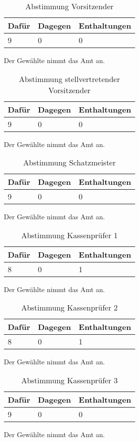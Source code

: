 \documentclass[a4paper]{scrartcl}
\begin{document}
\clearpage

\begin{table}[h]
\begin{tabularx}{\textwidth}{XXX}
Dafür & Dagegen & Enthaltungen\\
\toprule
9 & 0 & 0\\
\end{tabularx}
\caption{Abstimmung Vorsitzender}
\end{table}
Der Gewählte nimmt das Amt an.

\begin{table}[h]
\begin{tabularx}{\textwidth}{XXX}
Dafür & Dagegen & Enthaltungen\\
\toprule
9 & 0 & 0\\
\end{tabularx}
\caption{Abstimmung stellvertretender Vorsitzender}
\end{table}
Der Gewählte nimmt das Amt an.

\begin{table}[h]
\begin{tabularx}{\textwidth}{XXX}
Dafür & Dagegen & Enthaltungen\\
\toprule
9 & 0 & 0\\
\end{tabularx}
\caption{Abstimmung Schatzmeister}
\end{table}
Der Gewählte nimmt das Amt an.

\clearpage

\begin{table}[h]
\begin{tabularx}{\textwidth}{XXX}
Dafür & Dagegen & Enthaltungen\\
\toprule
8 & 0 & 1\\
\end{tabularx}
\caption{Abstimmung Kassenprüfer 1}
\end{table}
Der Gewählte nimmt das Amt an.

\begin{table}[h]
\begin{tabularx}{\textwidth}{XXX}
Dafür & Dagegen & Enthaltungen\\
\toprule
8 & 0 & 1\\
\end{tabularx}
\caption{Abstimmung Kassenprüfer 2}
\end{table}
Der Gewählte nimmt das Amt an.

\begin{table}[h]
\begin{tabularx}{\textwidth}{XXX}
Dafür & Dagegen & Enthaltungen\\
\toprule
9 & 0 & 0\\
\end{tabularx}
\caption{Abstimmung Kassenprüfer 3}
\end{table}
Der Gewählte nimmt das Amt an.
\end{document}
